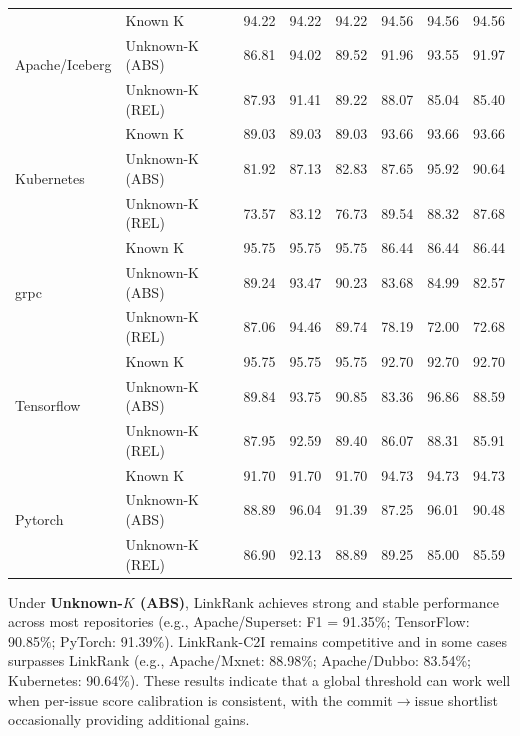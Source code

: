 \begin{table}[htbp]
\begin{tabular}{@{}llcccccc@{}}
\multirow{3}{*}{Apache/Iceberg}
 & Known K         & 94.22 & 94.22 & 94.22 & 94.56 & 94.56 & 94.56 \\
 & Unknown-K (ABS) & 86.81 & 94.02 & 89.52 & 91.96 & 93.55 & 91.97 \\
 & Unknown-K (REL) & 87.93 & 91.41 & 89.22 & 88.07 & 85.04 & 85.40 \\
\midrule

\multirow{3}{*}{Kubernetes}
 & Known K         & 89.03 & 89.03 & 89.03 & 93.66 & 93.66 & 93.66 \\
 & Unknown-K (ABS) & 81.92 & 87.13 & 82.83 & 87.65 & 95.92 & 90.64 \\
 & Unknown-K (REL) & 73.57 & 83.12 & 76.73 & 89.54 & 88.32 & 87.68 \\
\midrule

\multirow{3}{*}{grpc}
 & Known K         & 95.75 & 95.75 & 95.75 & 86.44 & 86.44 & 86.44 \\
 & Unknown-K (ABS) & 89.24 & 93.47 & 90.23 & 83.68 & 84.99 & 82.57 \\
 & Unknown-K (REL) & 87.06 & 94.46 & 89.74 & 78.19 & 72.00 & 72.68 \\
\midrule

\multirow{3}{*}{Tensorflow}
 & Known K         & 95.75 & 95.75 & 95.75 & 92.70 & 92.70 & 92.70 \\
 & Unknown-K (ABS) & 89.84 & 93.75 & 90.85 & 83.36 & 96.86 & 88.59 \\
 & Unknown-K (REL) & 87.95 & 92.59 & 89.40 & 86.07 & 88.31 & 85.91 \\
\midrule

\multirow{3}{*}{Pytorch}
 & Known K         & 91.70 & 91.70 & 91.70 & 94.73 & 94.73 & 94.73 \\
 & Unknown-K (ABS) & 88.89 & 96.04 & 91.39 & 87.25 & 96.01 & 90.48 \\
 & Unknown-K (REL) & 86.90 & 92.13 & 88.89 & 89.25 & 85.00 & 85.59 \\
\bottomrule
\end{tabular}
\end{table}


Under \textbf {Unknown-$K$ (ABS)}, LinkRank achieves strong and stable performance across most repositories (e.g., Apache/Superset: F1 = 91.35\%; TensorFlow: 90.85\%; PyTorch: 91.39\%). LinkRank-C2I remains competitive and in some cases surpasses LinkRank (e.g., Apache/Mxnet: 88.98\%; Apache/Dubbo: 83.54\%; Kubernetes: 90.64\%). These results indicate that a global threshold can work well when per-issue score calibration is consistent, with the commit$\rightarrow$issue shortlist occasionally providing additional gains.\\

